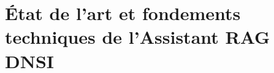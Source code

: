 
\chapter{État de l'art et fondements techniques de l'Assistant RAG DNSI}
\label{chap:etat_art}





